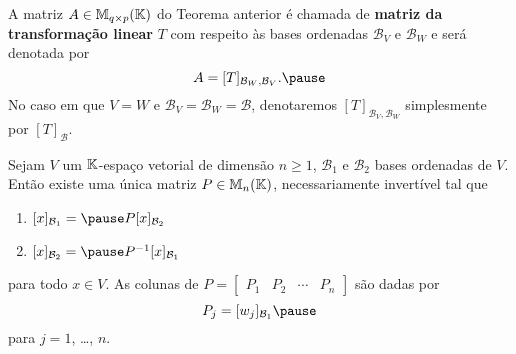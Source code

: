 \documentclass{beamer}
\begin{document}
    \begin{frame}
        \begin{definicao}
            A matriz $A \in \mathbb{M}_{q\times p}(\mathbb{K})$ do Teorema anterior \pause é chamada de \textbf{matriz da transformação linear}
            \pause $T$ com respeito às bases ordenadas $\mathcal{B}_V$ e $\mathcal{B}_W$ \pause e será denotada por\pause
            \[
                A = [T]_{\mathcal{B}_{W},\mathcal{B}_{V}}.\pause
            \]
            No caso em que $V = W$ \pause e $\mathcal{B}_V = \mathcal{B}_W = \mathcal{B}$, \pause denotaremos
            $[T]_{\mathcal{B}_{V},\mathcal{B}_{W}}$ \pause simplesmente por $[T]_\mathcal{B}$.
        \end{definicao}
    \end{frame}

    \begin{frame}
        \begin{teorema}
            Sejam $V$ um $\mathbb{K}$-espaço vetorial de dimensão $n \ge 1$, \pause $\mathcal{B}_1$ e $\mathcal{B}_2$ bases ordenadas de $V$.
            \pause Então existe uma única matriz $P \in \mathbb{M}_n(\mathbb{K})$, \pause necessariamente invertível tal que\pause
            \begin{enumerate}[label={\roman*})]
                \vspace*{.25cm}
                \item $[x]_{\mathcal{B}_1} = \pause P[x]_{\mathcal{B}_2}$\pause

                \vspace{.75cm}

                \item $[x]_{\mathcal{B}_2} = \pause P^{-1}[x]_{\mathcal{B}_1}$\pause
            \end{enumerate}

            \vspace{.2cm}

            para todo $x \in V$. \pause As colunas de $P = \begin{bmatrix}P_1 & P_2 & \cdots & P_n \end{bmatrix}$ \pause
            são dadas por\pause
            \[
                P_j = [w_j]_{\mathcal{B}_1}\pause
            \]
            para $j = 1$, \dots, $n$.
        \end{teorema}
    \end{frame}
\end{document}
